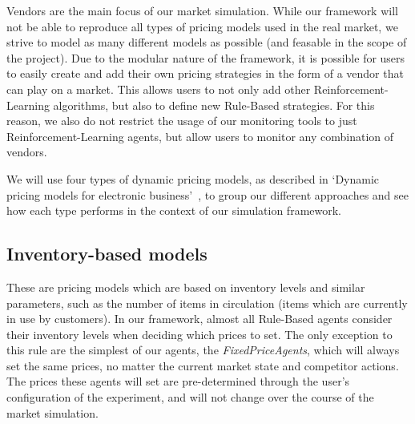 Vendors are the main focus of our market simulation. While our framework will not be able to reproduce all types of pricing models used in the real market, we strive to model as many different models as possible (and feasable in the scope of the project). Due to the modular nature of the framework, it is possible for users to easily create and add their own pricing strategies in the form of a vendor that can play on a market. This allows users to not only add other Reinforcement-Learning algorithms, but also to define new Rule-Based strategies. For this reason, we also do not restrict the usage of our monitoring tools to just Reinforcement-Learning agents, but allow users to monitor any combination of vendors.

We will use four types of dynamic pricing models, as described in `Dynamic pricing models for electronic business'~\cite{dynamicPricingModels}, to group our different approaches and see how each type performs in the context of our simulation framework.

\subsection*{Inventory-based models}\label{subsec:InventoryBasedModels}

These are pricing models which are based on inventory levels and similar parameters, such as the number of items in circulation (items which are currently in use by customers). In our framework, almost all Rule-Based agents consider their inventory levels when deciding which prices to set. The only exception to this rule are the simplest of our agents, the \emph{FixedPriceAgents}, which will always set the same prices, no matter the current market state and competitor actions. The prices these agents will set are pre-determined through the user's configuration of the experiment, and will not change over the course of the market simulation.

